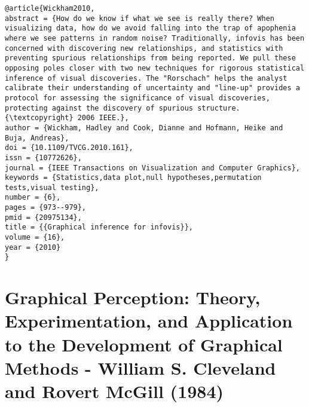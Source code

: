 \documentclass[
]{book}
\begin{document}
\begin{verbatim}
@article{Wickham2010,
abstract = {How do we know if what we see is really there? When visualizing data, how do we avoid falling into the trap of apophenia where we see patterns in random noise? Traditionally, infovis has been concerned with discovering new relationships, and statistics with preventing spurious relationships from being reported. We pull these opposing poles closer with two new techniques for rigorous statistical inference of visual discoveries. The "Rorschach" helps the analyst calibrate their understanding of uncertainty and "line-up" provides a protocol for assessing the significance of visual discoveries, protecting against the discovery of spurious structure. {\textcopyright} 2006 IEEE.},
author = {Wickham, Hadley and Cook, Dianne and Hofmann, Heike and Buja, Andreas},
doi = {10.1109/TVCG.2010.161},
issn = {10772626},
journal = {IEEE Transactions on Visualization and Computer Graphics},
keywords = {Statistics,data plot,null hypotheses,permutation tests,visual testing},
number = {6},
pages = {973--979},
pmid = {20975134},
title = {{Graphical inference for infovis}},
volume = {16},
year = {2010}
}
\end{verbatim}

\hypertarget{graphical-perception-theory-experimentation-and-application-to-the-development-of-graphical-methods---william-s.-cleveland-and-rovert-mcgill-1984}{%
\section{Graphical Perception: Theory, Experimentation, and Application to the Development of Graphical Methods - William S. Cleveland and Rovert McGill (1984)}\label{graphical-perception-theory-experimentation-and-application-to-the-development-of-graphical-methods---william-s.-cleveland-and-rovert-mcgill-1984}}
\end{document}
